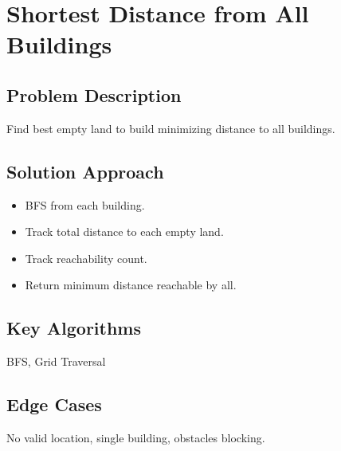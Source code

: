 \documentclass[10pt, a4paper]{article}
\begin{document}
\section{Shortest Distance from All Buildings}
\subsection*{Problem Description}
Find best empty land to build minimizing distance to all buildings.

\subsection*{Solution Approach}
\begin{itemize}
    \item BFS from each building.
    \item Track total distance to each empty land.
    \item Track reachability count.
    \item Return minimum distance reachable by all.
\end{itemize}

\subsection*{Key Algorithms}
BFS, Grid Traversal

\subsection*{Edge Cases}
No valid location, single building, obstacles blocking.
\end{document}
